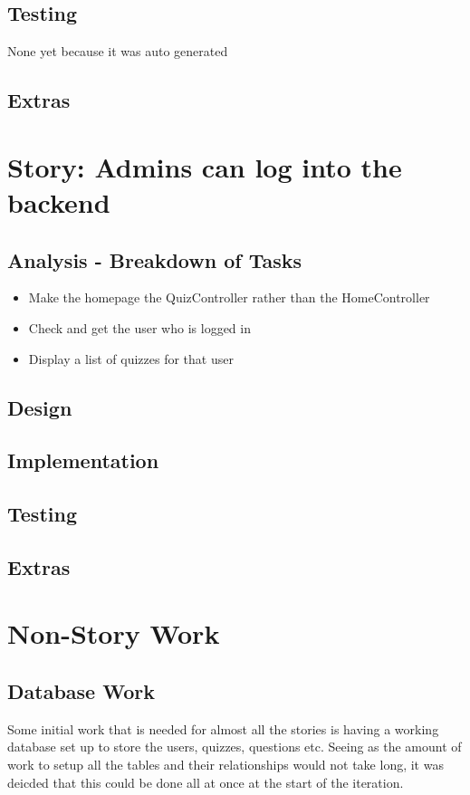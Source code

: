 \documentclass{article}
\begin{document}
\subsection{Testing}
None yet because it was auto generated
\subsection{Extras}
\newpage

\section{Story: Admins can log into the backend}
\subsection{Analysis - Breakdown of Tasks}
\begin{itemize}
	\item Make the homepage the QuizController rather than the HomeController
	\item Check and get the user who is logged in
	\item Display a list of quizzes for that user
\end{itemize}
\subsection{Design}
\subsection{Implementation}
\subsection{Testing}
\subsection{Extras}
\newpage

\section{Non-Story Work}
\subsection{Database Work}
Some initial work that is needed for almost all the stories is having a working database set up to store the users, quizzes, questions etc. Seeing as the amount of work to setup all the tables and their relationships would not take long, it was deicded that this could be done all at once at the start of the iteration.
\end{document}

